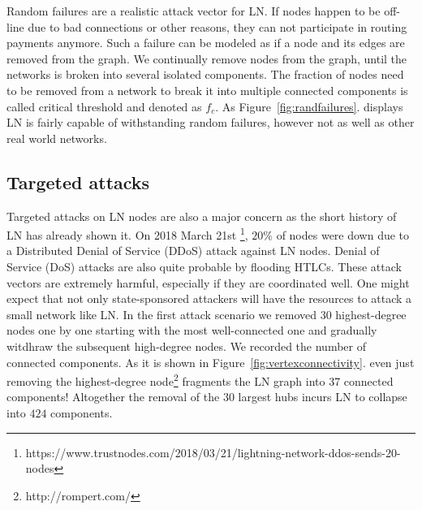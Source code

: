\documentclass[a4paper]{article}
\theoremstyle{definition}
\begin{document}
Random failures are a realistic attack vector for LN. If nodes happen to be off-line due to bad connections or other reasons, they can not participate in routing payments anymore. Such a failure can be modeled as if a node and its edges are removed from the graph. We continually remove nodes from the graph, until the networks is broken into several isolated components. The fraction of nodes need to be removed from a network to break it into multiple connected components is called critical threshold and denoted as $f_c$. As Figure~\ref{fig:randfailures}. displays LN is fairly capable of withstanding random failures, however not as well as other real world networks.


\subsection{Targeted attacks}
Targeted attacks on LN nodes are also a major concern as the short history of LN has already shown it. On 2018 March 21st \footnote{https://www.trustnodes.com/2018/03/21/lightning-network-ddos-sends-20-nodes}, $20\%$ of nodes were down due to a Distributed Denial of Service (DDoS) attack against LN nodes. Denial of Service (DoS) attacks are also quite probable by flooding HTLCs. These attack vectors are extremely harmful, especially if they are coordinated well. One might expect that not only state-sponsored attackers will have the resources to attack a small network like LN. In the first attack scenario we removed 30 highest-degree nodes one by one starting with the most well-connected one and gradually witdhraw the subsequent high-degree nodes. We recorded the number of connected components. As it is shown in Figure~\ref{fig:vertexconnectivity}. even just removing the highest-degree node\footnote{http://rompert.com/} fragments the LN graph into 37 connected components! Altogether the removal of the $30$ largest hubs incurs LN to collapse into $424$ components.     
\end{document}
